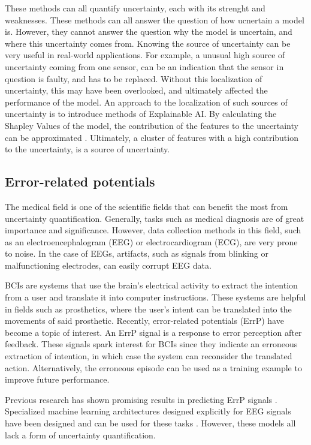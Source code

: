 These methods can all quantify uncertainty, each with its strenght and weaknesses. These methods can all answer the question of how ucnertain a model is. However, they cannot answer the question why the model is uncertain, and where this uncertainty comes from. Knowing the source of uncertainty can be very useful in real-world applications. For example, a unusual high source of uncertainty coming from one sensor, can be an indication that the sensor in question is faulty, and has to be replaced. Without this localization of uncertainty, this may have been overlooked, and ultimately affected the performance of the model. An approach to the localization of such sources of uncertainty is to introduce methods of Explainable AI. By calculating the Shapley Values of the model, the contribution of the features to the uncertainty can be approximated \citep{merrick2020explanation}. Ultimately, a cluster of features with a high contribution to the uncertainty, is a source of uncertainty. 

\subsection{Error-related potentials}

The medical field is one of the scientific fields that can benefit the most from uncertainty quantification. Generally, tasks such as medical diagnosis are of great importance and significance. However, data collection methods in this field, such as an electroencephalogram (EEG) or electrocardiogram  (ECG), are very prone to noise. In the case of EEGs, artifacts, such as signals from blinking or malfunctioning electrodes, can easily corrupt EEG data.

BCIs are systems that use the brain's electrical activity to extract the intention from a user and translate it into computer instructions. These systems are helpful in fields such as prosthetics, where the user's intent can be translated into the movements of said prosthetic. Recently, error-related potentials (ErrP) have become a topic of interest. An ErrP signal is a response to error perception after feedback. These signals spark interest for BCIs since they indicate an erroneous extraction of intention, in which case the system can reconsider the translated action. Alternatively, the erroneous episode can be used as a training example to improve future performance. 

Previous research has shown promising results in predicting ErrP signals \citep{correia2021error}. Specialized machine learning architectures designed explicitly for EEG signals have been designed and can be used for these tasks \citep{lawhern2018eegnet}. However, these models all lack a form of uncertainty quantification.

